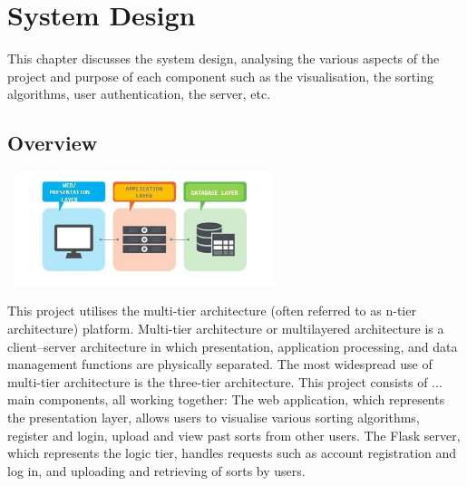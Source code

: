 \chapter{System Design}
This chapter discusses the system design, analysing the various aspects of the project and purpose of each component such as the visualisation, the sorting algorithms, user authentication, the server, etc.

\section{Overview}
\begin{center}
    \includegraphics[width=8cm,height=3.3cm,keepaspectratio]{images/3tier}
\end{center}

This project utilises the multi-tier architecture (often referred to as n-tier architecture) platform. Multi-tier architecture or multilayered architecture is a client–server architecture in which presentation, application processing, and data management functions are physically separated. The most widespread use of multi-tier architecture is the three-tier architecture. This project consists of ... main components, all working together: The web application, which represents the presentation layer, allows users to visualise various sorting algorithms, register and login, upload and view past sorts from other users. The Flask server, which represents the logic tier, handles requests such as account registration and log in, and uploading and retrieving of sorts by users.

